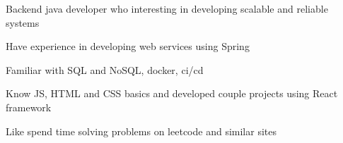 \documentclass[]{cv-style}
\begin{document}
    \hspace*{0.7cm} Backend java developer who interesting in developing scalable and reliable systems
    {\par}
    \hspace*{0.7cm} Have experience in developing web services using Spring
    {\par}
    \hspace*{0.7cm} Familiar with SQL and NoSQL, docker, ci/cd
    {\par}
    \hspace*{0.7cm} Know JS, HTML and CSS basics and developed couple projects using React framework
    {\par}
    \hspace*{0.7cm} Like spend time solving problems on leetcode and similar sites

    \vspace{0.3cm}

    \footer
\end{document}
